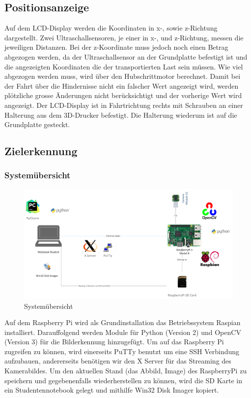 \documentclass[a4paper]{report}
\begin{document}
\subsection{Positionsanzeige}

Auf dem LCD-Display werden die Koordinaten in x-, sowie z-Richtung dargestellt. Zwei Ultraschallsensoren, je einer in x-, und z-Richtung, messen die jeweiligen Distanzen. Bei der z-Koordinate muss jedoch noch einen Betrag abgezogen werden, da der Ultraschallsensor an der Grundplatte befestigt ist und die angezeigten Koordinaten die der transportierten Last sein müssen. Wie viel abgezogen werden muss, wird über den Hubschrittmotor berechnet. Damit bei der Fahrt über die Hindernisse nicht ein falscher Wert angezeigt wird, werden plötzliche grosse Änderungen nicht berücksichtigt und der vorherige Wert wird angezeigt. Der LCD-Display ist in Fahrtrichtung rechts mit Schrauben an einer Halterung aus dem 3D-Drucker befestigt. Die Halterung wiederum ist auf die Grundplatte gesteckt.

\subsection{Zielerkennung}
\subsubsection{Systemübersicht}

\begin{figure}[h!]
	\includegraphics[keepaspectratio,width=\textwidth]{TargetRecOS}
	\caption{Systemübersicht}
	\label{fig:Systemuebersicht}
\end{figure}

Auf dem Raspberry Pi wird als Grundinstallation das Betriebssystem Raspian installiert. Darauffolgend werden Module für Python (Version 2) und OpenCV (Version 3) für die Bilderkennung hinzugefügt.
Um auf das Raspberry Pi zugreifen zu können, wird einerseits PuTTy benutzt um eine SSH Verbindung aufzubauen, andererseits benötigen wir den X Server für das Streaming des Kamerabildes.
Um den aktuellen Stand (das Abbild, Image) des RaspberryPi zu speichern und gegebenenfalls wiederherstellen zu können, wird die SD Karte in ein Studentennotebook gelegt und mithilfe Win32 Disk Imager kopiert.
\end{document}
